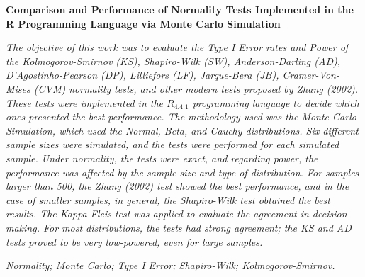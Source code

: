 \documentclass[a4paper,11pt]{article} %
\begin{document}
\begin{center}
    {\large {\bf Comparison and Performance of Normality Tests Implemented in the R Programming Language via Monte Carlo Simulation}\vspace{0.3cm}}
\end{center}
\begin{small}
 {\it 
    The objective of this work was to evaluate the Type I Error rates and Power of the Kolmogorov-Smirnov (KS), Shapiro-Wilk (SW), Anderson-Darling (AD), D’Agostinho-Pearson (DP), Lilliefors (LF), Jarque-Bera (JB), Cramer-Von-Mises (CVM) normality tests, and other modern tests proposed by Zhang (2002). These tests were implemented in the $R_{4.4.1}$ programming language to decide which ones presented the best performance. The methodology used was the Monte Carlo Simulation, which used the Normal, Beta, and Cauchy distributions. Six different sample sizes were simulated, and the tests were performed for each simulated sample. Under normality, the tests were exact, and regarding power, the performance was affected by the sample size and type of distribution. For samples larger than 500, the Zhang (2002) test showed the best performance, and in the case of smaller samples, in general, the Shapiro-Wilk test obtained the best results. The Kappa-Fleis test was applied to evaluate the agreement in decision-making. For most distributions, the tests had strong agreement; the KS and AD tests proved to be very low-powered, even for large samples.
}
    
\vspace{0.5cm}

  {\it Normality; Monte Carlo; Type I Error; Shapiro-Wilk; Kolmogorov-Smirnov.\vspace{0.3cm}}
\end{small}
\newpage                                                                                   
\pagestyle{fancy}                                                                          
\renewcommand{\thefootnote}{\roman{footnote}}                                              
\lhead{}
\chead{\small \slshape}
\rhead{\thepage}
\lfoot{}
\rfoot{}
\end{document}

